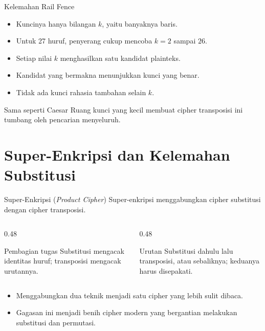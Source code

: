 \documentclass[aspectratio=169,11pt]{beamer}
\begin{document}
\begin{frame}{Kelemahan Rail Fence}
    \begin{itemize}
        \item Kuncinya hanya bilangan $k$, yaitu banyaknya baris.
        \item Untuk 27 huruf, penyerang cukup mencoba $k=2$ sampai $26$.
        \item Setiap nilai $k$ menghasilkan satu kandidat plainteks.
        \item Kandidat yang bermakna menunjukkan kunci yang benar.
        \item Tidak ada kunci rahasia tambahan selain $k$.
    \end{itemize}
    \vspace{0.15cm}
    \begin{alertblock}{Sama seperti Caesar}
        \footnotesize
        Ruang kunci yang kecil membuat cipher transposisi ini tumbang oleh
        pencarian menyeluruh.
    \end{alertblock}
\end{frame}

\section{Super-Enkripsi dan Kelemahan Substitusi}

\begin{frame}{Super-Enkripsi (\textit{Product Cipher})}
    Super-enkripsi menggabungkan cipher substitusi dengan cipher transposisi.
    \begin{columns}[T,onlytextwidth]
        \begin{column}{0.48\textwidth}
            \begin{block}{Pembagian tugas}
                \footnotesize
                Substitusi mengacak identitas huruf; transposisi mengacak
                urutannya.
            \end{block}
        \end{column}
        \begin{column}{0.48\textwidth}
            \begin{exampleblock}{Urutan}
                \footnotesize
                Substitusi dahulu lalu transposisi, atau sebaliknya; keduanya
                harus disepakati.
            \end{exampleblock}
        \end{column}
    \end{columns}
    \vspace{0.15cm}
    \begin{itemize}
        \item Menggabungkan dua teknik menjadi satu cipher yang lebih sulit
              dibaca.
        \item Gagasan ini menjadi benih cipher modern yang bergantian
              melakukan substitusi dan permutasi.
    \end{itemize}
\end{frame}
\end{document}
